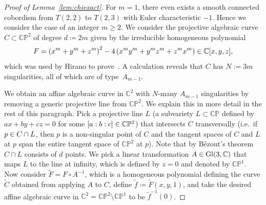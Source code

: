 \documentclass[10pt,a4paper]{article}
\theoremstyle{definition}
\numberwithin{equation}{section}
\DeclareMathOperator{\Gl}{Gl}
\newcommand*\C{\mathbb{C}}
\renewcommand*\P{\mathbb{P}}
\let\oldin\in
\renewcommand{\in}{\mathchoice{\oldin}{\oldin}{\,\oldin\,}{\,\oldin\,}}
\begin{document}
\begin{proof}[Proof of Lemma~\ref{lem:chiexact}]
For $m=1$, there even exists a smooth connected cobordism from $T(2,2)$ to $T(2,3)$ with Euler characteristic $-1$. Hence we consider the case of an integer $m\geq 2$. We consider the projective algebraic curve $C\subset \C\P^2$ of degree $d\coloneqq 2m$ given by the irreducible homogeneous polynomial
\[
F= \left(x^{m}+y^{m}+z^{m}\right)^2-4\left(x^{m}y^{m}+y^{m}z^{m}+z^{m}x^{m}\right)\in\C[x,y,z],
\]
which was used by Hirano to prove~\cite[Theorem~2]{Hirano_92}. A calculation reveals that $C$ has $N:= 3m$ singularities, all of which are of type~$A_{m-1}$.

We obtain an affine algebraic curve in $\C^2$ with $N$-many $A_{m-1}$ singularities by removing a generic projective line from $\C\P^2$. We explain this in more detail in the rest of this paragraph. Pick a projective line $L$ (a subvariety $L\subset \C\P$ defined by $ax+by+cz=0$ for some $[a:b:c]\in\C\P^2$) that intersects $C$ transversally (i.e.~if $p\in C\cap L$, then $p$ is a non-singular point of $C$ and the tangent spaces of $C$ and $L$ at $p$ span the entire tangent space of $\C\P^2$ at $p$). Note that by Bézout's theorem~$C\cap L$ consists of $d$ points. We pick a linear transformation $A\in \Gl(3,\C)$ that maps $L$ to the line at infinity, which is defined by $z=0$ and denoted by $\C\P^1$. Now consider $\widetilde{F}=F\circ A^{-1}$, which is a homogeneous polynomial defining the curve $\widetilde{C}$ obtained from applying $A$ to $C$, define $\widetilde{f}\coloneqq \widetilde{F}(x,y,1)$, and take the desired affine algebraic curve in $\C^2=\C\P^2\setminus \C\P^1$ to be $\widetilde{f}^{-1}(0)$.


\end{proof}
\end{document}
